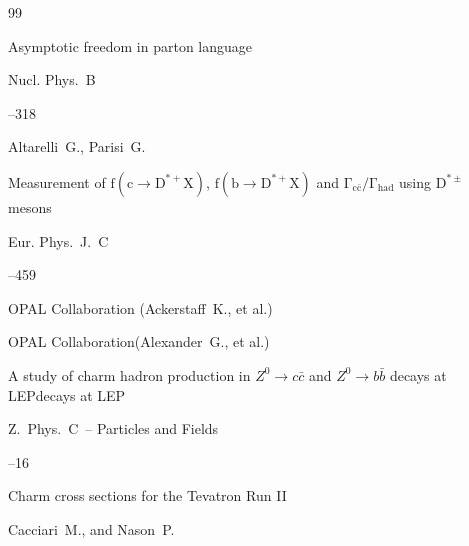 \begin{thebibliography}{99}

\paper Asymptotic freedom in parton language


\jour Nucl. Phys.~B



--318

\by  Altarelli~G.,  Parisi~G.







\paper Measurement of $\mathrm{ f(c\to D^{*+}X)}$, $\mathrm{ f(b\to D^{*+}X)}$ and $\mathrm{ \Gamma_{c \bar c}/\Gamma_{had}}$  using $\mathrm{  D^{*\pm}}$ mesons


\jour Eur. Phys.~J.~C 



--459

\by OPAL Collaboration (Ackerstaff~K., et al.)





\by  OPAL Collaboration(Alexander~G., et al.)

\paper A study of charm hadron production in $Z^0 \to c\bar c$ and $Z^0 \to b\bar b$ decays at LEPdecays at LEP

\jour Z.~Phys.~C~-- Particles and Fields 



--16






\paper Charm cross sections for the Tevatron Run II






\by Cacciari~M., and Nason~P.


\end{thebibliography}
